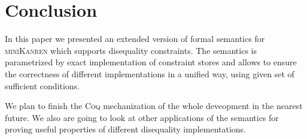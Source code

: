 \section{Conclusion}

In this paper we presented an extended version of formal semantics for \textsc{miniKanren} which supports disequality constraints.
The semantics is parametrized by exact implementation of constraint stores and allows to ensure the correctness of different implementations
in a unified way, using given set of sufficient conditions.

We plan to finish the \textsc{Coq} mechanization of the whole deveopment in the nearest future. We also are going to look at other applications
of the semantics for proving useful properties of different disequality implementations.

